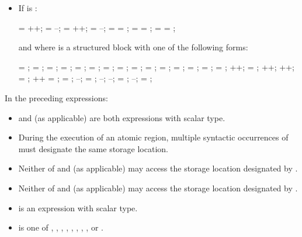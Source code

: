 \begin{ccppspecific}
\begin{itemize}
\item If  is :
\begin{ompSyntax}
 = ++;
 = --;
 = ++;
 = --;
 =  = ;
 =  =   ;
 =  =   ;
\end{ompSyntax}

and where  is a structured block with one of the following forms:

\begin{ompSyntax}
{  = ;  = ; }
{  = ;  = ; }
{  = ;  =   ; }
{  = ;  =   ; }
{  =   ;  = ; }
{  =   ;  = ; }
{  = ;  = ; }
{  = ; ++; }
{  = ; ++; }
{ ++;  = ; }
{ ++\code{;}  = ; }
{  = ; --; }
{  = ; --; }
{ --;  = ; }
{ --;  = ; }
\end{ompSyntax}
\end{itemize}

In the preceding expressions:

\begin{itemize}
\item {} and  (as applicable) are both  expressions with scalar type.

\item During the execution of an atomic region, multiple syntactic occurrences of  must
designate the same storage location.

\item Neither of  and  (as applicable) may access the storage location designated by .

\item Neither of  and  (as applicable) may access the storage location designated by .

\item {} is an expression with scalar type.

\item {} is one of \code{+}, \code{*}, \code{-}, \code{/},
\code{&}, \code{^}, \code{|}, \code{<<}, or
\code{>>}.


\end{itemize}
\end{ccppspecific}
